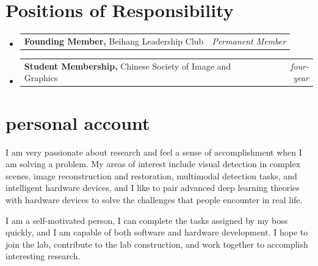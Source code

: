 \documentclass[a4paper,11pt]{article}
\makeatletter
\newcommand{\resumePOR}[3]{
\vspace{0.5mm}\item
    \begin{tabular*}{0.97\textwidth}[t]{l@{\extracolsep{\fill}}r}
        \textbf{#1}\hspace{0.3mm}#2 & \textit{\small{#3}} 
    \end{tabular*}
    \vspace{-2mm}
}
\newcommand{\resumeSubHeadingListStart}{\begin{itemize}[leftmargin=*,labelsep=0mm]}
\newcommand{\resumeSubHeadingListEnd}{\end{itemize}\vspace{2mm}}
\makeatother
\begin{document}
\section{\textbf{Positions of Responsibility}}
\vspace{-0.4mm}
\resumeSubHeadingListStart
\resumePOR{Founding Member, } %
    {Beihang Leadership Club} %
    {Permanent Member} %
\resumePOR{Student Membership, } %
    {Chinese Society of Image and Graphics} %
    {four-year} %
\resumeSubHeadingListEnd
\vspace{-5mm}




\section{\textbf{personal account}}
\vspace{10pt}
I am very passionate about research and feel a sense of accomplishment when I am solving a problem. My areas of interest include visual detection in complex scenes, image reconstruction and restoration, multimodal detection tasks, and intelligent hardware devices, and I like to pair advanced deep learning theories with hardware devices to solve the challenges that people encounter in real life.

I am a self-motivated person, I can complete the tasks assigned by my boss quickly, and I am capable of both software and hardware development. I hope to join the lab, contribute to the lab construction, and work together to accomplish interesting research.
\vspace{-5mm}



\end{document}
